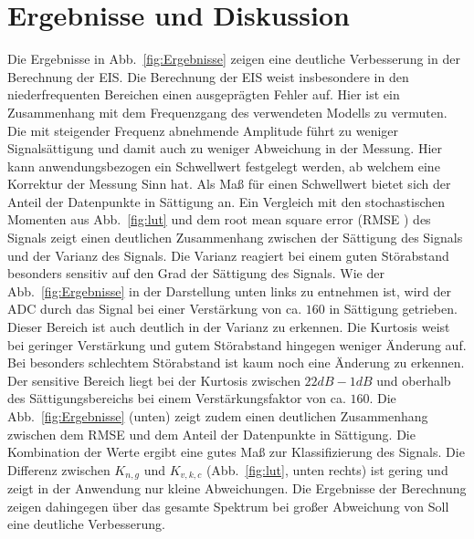 \section{Ergebnisse und Diskussion}
Die Ergebnisse in Abb.~\ref{fig:Ergebnisse} zeigen eine deutliche Verbesserung in der Berechnung der EIS.
Die Berechnung der EIS weist insbesondere in den niederfrequenten Bereichen einen ausgeprägten Fehler auf. Hier ist ein Zusammenhang mit dem Frequenzgang des verwendeten Modells zu vermuten. Die mit steigender Frequenz abnehmende Amplitude führt zu weniger Signalsättigung und damit auch zu weniger Abweichung in der Messung. Hier kann anwendungsbezogen ein Schwellwert festgelegt werden, ab welchem eine Korrektur der Messung Sinn hat. Als Maß für einen Schwellwert bietet sich der Anteil der Datenpunkte in Sättigung an. 
Ein Vergleich mit den stochastischen Momenten aus Abb.~\ref{fig:lut} und dem root mean square error (RMSE ) des Signals zeigt einen deutlichen Zusammenhang zwischen der Sättigung des Signals und der Varianz des Signals. Die Varianz reagiert bei einem guten Störabstand besonders sensitiv auf den Grad der Sättigung des Signals. Wie der Abb.~\ref{fig:Ergebnisse} in der Darstellung unten links zu entnehmen ist, wird der ADC durch das Signal bei einer Verstärkung von ca. $160$ in Sättigung getrieben. Dieser Bereich ist auch deutlich in der Varianz zu erkennen. Die Kurtosis weist bei geringer Verstärkung und gutem Störabstand hingegen weniger Änderung auf. Bei besonders schlechtem Störabstand ist kaum noch eine Änderung zu erkennen. Der sensitive Bereich liegt bei der Kurtosis zwischen $22dB - 1dB$ und oberhalb des Sättigungsbereichs bei einem Verstärkungsfaktor von ca. $160$. Die Abb.~\ref{fig:Ergebnisse} (unten) zeigt zudem einen deutlichen Zusammenhang zwischen dem RMSE und dem Anteil der Datenpunkte in Sättigung. 
Die Kombination der Werte ergibt eine gutes Maß zur Klassifizierung des Signals. Die Differenz zwischen $K_{n,g}$ und $K_{v,k,c}$ (Abb.~\ref{fig:lut}, unten rechts) ist gering und zeigt in der Anwendung nur kleine Abweichungen. Die Ergebnisse der Berechnung zeigen dahingegen über das gesamte Spektrum bei großer Abweichung von Soll eine deutliche Verbesserung.

